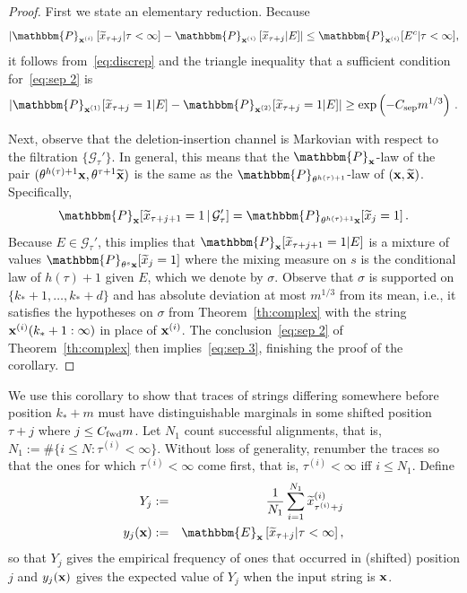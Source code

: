 \documentclass[final,12pt]{colt2018} %
\newcommand{\E}{\mathbbm{E}}
\renewcommand{\P}{\mathbbm{P}}
\newcommand{\1}{\mathbf{1}}
\def\cG{\mathcal{G}}
\newcommand{\eqb}{\begin{equation}}
\newcommand{\eqe}{\end{equation}}
\newcommand{\wt}{\widetilde}
\def\xt{{\wt {\bf x}}}
\def\x{{\bf x}}
\def\csep{C_{\rm sep}} %
\def\cfwd{C_{\rm fwd}} %
\begin{document}
\begin{proof}
	First we state an elementary reduction.  Because
	$$\left | \P_{\x^{(i)}} \left [ \wt x_{\tau + j} | \tau < \infty \right ] -
	\P_{\x^{(i)}} \left [ \wt x_{\tau + j} | E \right ] \right |
	\leq \P_{\x^{(i)}} [E^c | \tau < \infty],$$
	it follows from~\eqref{eq:discrep} and the triangle inequality
	that a sufficient condition for~\eqref{eq:sep 2} is
	\eqb \label{eq:sep 3}
	\left | \P_{\x^{(1)}} [\wt x_{\tau + j} = 1 | E] -
	\P_{\x^{(2)}} [\wt x_{\tau + j} = 1 | E] \right |
	\geq \exp \left ( - \csep m^{1/3} \right ) \, .
	\eqe
	
	Next, observe that the deletion-insertion channel is Markovian with
	respect to the filtration $\{ \cG_{\tau}' \}$.  In general, this
	means that the $\P_\x$-law of the pair $(\theta^{h(\tau)+1} \x ,
	\theta^{\tau+1} \xt)$ is the same as the $\P_{\theta^{h(\tau)+1}}$-law
	of $(\x , \xt)$.
	Specifically,
	\eqb \label{eq:markov}
	\P_{\x} [\wt x_{\tau + j+1} = 1 \,|\, \cG_{\tau}']
	= \P_{\theta^{h(\tau)+1} \x} [\wt x_j = 1] \, .
	\eqe
	Because $E \in \cG_{\tau}'$, this implies that
	$\P_{\x} [\wt x_{\tau + j+1} = 1 | E]$ is a mixture of values
	$\P_{\theta^{s} \x} [\wt x_j = 1]$ where the mixing measure
	on $s$ is the conditional law of $h(\tau)+1$ given $E$, which
	we denote by $\sigma$. Observe that $\sigma$ is
	supported on $\{ k_*+1 , \ldots , k_*+d \}$ and has absolute
	deviation at most $m^{1/3}$ from its mean, i.e., it satisfies the hypotheses on $\sigma$ from Theorem~\ref{th:complex} with the string $\x^{(i)}
	(k_*+1 : \infty)$ in place of $\x^{(i)}$.  The conclusion~\eqref{eq:sep 2}
	of Theorem~\ref{th:complex} then implies~\eqref{eq:sep 3}, finishing
	the proof of the corollary.
\end{proof}

We use this corollary to show that traces of strings differing somewhere
before position $k_* + m$ must have distinguishable marginals in some
shifted position $\tau + j$ where $j \leq \cfwd m$. Let $N_1$ count successful alignments, that is, $N_1 :=
\# \{ i \leq N : \tau^{(i)} < \infty \}$.  Without loss of generality,
renumber the traces so that the ones for which $\tau^{(i)} < \infty$ come first,
that is, $\tau^{(i)} < \infty$ iff $i \leq N_1$. Define
\begin{eqnarray}
Y_j & := & \frac{1}{N_1} \sum_{i=1}^{N_1} \wt x^{(i)}_{\tau^{(i)} + j} \label{eq:Y} \\
y_j (\x) & := & \E_\x \left [ \wt x_{\tau + j} | \tau < \infty \right ],
\label{eq:y}
\end{eqnarray}
so that $Y_j$ gives the empirical frequency of ones that occurred
in (shifted) position $j$ and $y_j (\x)$ gives the expected value
of $Y_j$ when the input string is $\x$.
\end{document}
